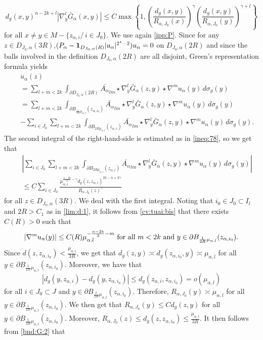 \documentclass[reqno]{amsart}
\def \crit {2^\star}
\def \ua {u_\alpha}
\def \mai {\mu_{\alpha,i}}
\def \zai {z_{\alpha,i}}
\def \mal {\mu_{\alpha,l}}
\begin{document}
\begin{equation}\label{bnd:G:2}
d_g(x,y)^{n-2k+l}|\nabla_y^l \bar{G}_\alpha(x,y)|\leq C \max\left\{1, \left(\frac{d_g(x,y)}{R_{\alpha,J_0}(x)}\right)^\gamma \left(\frac{d_g(x,y)}{R_{\alpha,J_0}(y)}\right)^{\gamma+l} \right\}
\end{equation}
for all $x\neq y\in M-\{\zai/\, i\in J_0\}$. We use again \eqref{ipp:P}. Since for any $z\in  D_{J_0,\alpha}(3R)$,$(P_\alpha-{\bf 1}_{D_{J_0,\alpha}(R)}|\ua|^{\crit-2})\ua=0$ on $D_{J_0,\alpha}(2R)$ and since the balls involved in the definition $D_{J_0,\alpha}(2R)$ are all disjoint, Green's representation formula yields
\begin{eqnarray*}
&&\ua(z)\\
&&= \sum_{l+m<2k}\int_{\partial D_{J_0,\alpha}(2R)}\bar{A_\alpha}_{lm}\star\nabla^l_y\bar{G}_\alpha(z,y)\star \nabla^m \ua(y)\, d\sigma_g(y)\\
&&= \sum_{l+m<2k}\int_{\partial B_{\frac{1}{2R}\mal}(z_{\alpha, i_0}) }\bar{A_\alpha}_{lm}\star\nabla^l_y\bar{G}_\alpha(z,y)\star \nabla^m \ua(y)\, d\sigma_g(y)\\&&-\sum_{i\in J_0}\sum_{l+m<2k}\int_{\partial B_{2R\mai}(\zai)}\bar{A_\alpha}_{lm}\star\nabla^l_y\bar{G}_\alpha(z,y)\star \nabla^m \ua (y)\, d\sigma_g(y).
\end{eqnarray*}
The second integral of the right-hand-side is estimated as in \eqref{ineq:78}, so  we get that 
\begin{eqnarray*}
&&\left|\sum_{i\in J_0}\sum_{l+m<2k}\int_{\partial B_{2R\mai}(\zai)}\bar{A_\alpha}_{lm}\star\nabla^l_y\bar{G}_\alpha(z,y)\star \nabla^m \ua (y)\, d\sigma_g(y)\right|\\
&&\leq C\sum_{i\in J_0}\frac{\mai^{\frac{n-2k}{2}-\gamma }d_g(z,\zai)^{2k-n+2\gamma}}{R_{\alpha, J_0}(z)^{\gamma}}\end{eqnarray*}
for all $z\in D_{J_0,\alpha}(3R)$. We deal with the first integral. Noting that $i_0\in J_0\subset I_l$ and $2R>C_1$ as in \eqref{lim:d:1}, it follows from  \eqref{cv:tuai:bis} that there exists  $C(R)>0$ such that
$$|\nabla^m \ua(y)|\leq C(R)\mal^{-\frac{n-2k}{2}-m}\hbox{ for all }m<2k\hbox{ and }y\in   \partial   B_{\frac{1}{2R}\mal}(z_{\alpha, i_0}).$$
Since $d(z,z_{\alpha, i_0})<\frac{\mal}{3R}$, we get that $d_g(z,y)\asymp d_g(z_{\alpha, i_0},y)\asymp\mal$ for all $y\in  \partial   B_{\frac{1}{2R}\mal}(z_{\alpha, i_0})$. Moreover, we have that
$$|d_g(y, \zai)-d_g(y,z_{\alpha, i_0} )|\leq d_g(\zai, z_{\alpha, i_0})=o(\mal)$$
for all $i\in J_0\subset J$ and $y\in  \partial   B_{\frac{1}{2R}\mal}(z_{\alpha, i_0})$. Therefore, $R_{\alpha, J_0}(y)\asymp \mal$ for all $y\in  \partial   B_{\frac{1}{2R}\mal}(z_{\alpha, i_0})$. We then get that $ R_{\alpha, J_0}(y)\leq C d_g(z,y)$ for all $y\in  \partial   B_{\frac{1}{2R}\mal}(z_{\alpha, i_0})$. Moreover, $R_{\alpha, J_0}(z)\leq d_g(z, z_{\alpha, i_0})\leq \frac{\mal}{3R}$. It then follows from \eqref{bnd:G:2} that 
\end{document}
